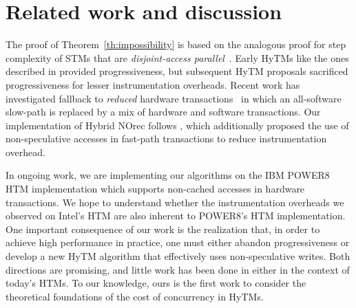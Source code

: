 \section{Related work and discussion}
\label{sec:rel}
%
The proof of Theorem~\ref{th:impossibility} is based on the analogous proof for step complexity of STMs that are \emph{disjoint-access parallel}~\cite{prog15-pact}.
Early HyTMs like the ones described in \cite{damronhytm, kumarhytm} provided progressiveness, but
subsequent HyTM proposals sacrificed progressiveness for lesser instrumentation overheads.
Recent work has investigated fallback to \emph{reduced} hardware transactions~\cite{MS13}
in which an all-software slow-path is replaced by a mix of hardware and software transactions. 
Our implementation of Hybrid NOrec follows \cite{hynorecriegel}, which additionally proposed the use of non-speculative accesses
in fast-path transactions to reduce instrumentation overhead. %

In ongoing work, we are implementing our algorithms on the IBM POWER8 HTM implementation which supports
non-cached accesses in hardware transactions.
We hope to understand whether the instrumentation overheads we observed
on Intel's HTM are also inherent to POWER8's HTM implementation.
One important consequence of our work is the realization that, in order to achieve high performance in practice, one must either abandon progressiveness or develop a new HyTM algorithm that effectively uses non-speculative writes.
Both directions are promising, and little work has been done in either in the context of today's HTMs.
To our knowledge, ours is the first work to consider the theoretical foundations of the cost of concurrency in HyTMs.